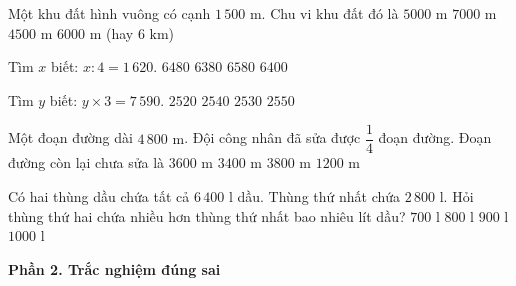 \begin{ex} %
Một khu đất hình vuông có cạnh $1\,500\text{ m}$. Chu vi khu đất đó là
\choice
{$5000\text{ m}$}
{$7000\text{ m}$}
{$4500\text{ m}$}
{\True $6000\text{ m}$ (hay $6\text{ km}$)}
\end{ex}

\begin{ex} %
Tìm $x$ biết: $x : 4 = 1\,620$.
\choice
{\True $6480$}
{$6380$}
{$6580$}
{$6400$}
\end{ex}

\begin{ex} %
Tìm $y$ biết: $y \times 3 = 7\,590$.
\choice
{$2520$}
{$2540$}
{\True $2530$}
{$2550$}
\end{ex}

\begin{ex} %
Một đoạn đường dài $4\,800\text{ m}$. Đội công nhân đã sửa được $\dfrac{1}{4}$ đoạn đường. Đoạn đường còn lại chưa sửa là
\choice
{\True $3600\text{ m}$}
{$3400\text{ m}$}
{$3800\text{ m}$}
{$1200\text{ m}$}
\end{ex}

\begin{ex} %
Có hai thùng dầu chứa tất cả $6\,400\text{ l}$ dầu. Thùng thứ nhất chứa $2\,800\text{ l}$. Hỏi thùng thứ hai chứa nhiều hơn thùng thứ nhất bao nhiêu lít dầu?
\choice
{$700\text{ l}$}
{\True $800\text{ l}$}
{$900\text{ l}$}
{$1000\text{ l}$}
\end{ex}

\textbf{Phần 2. Trắc nghiệm đúng sai}


